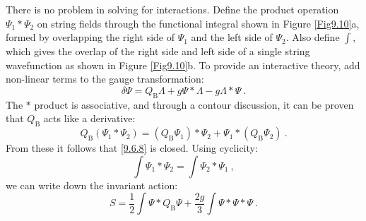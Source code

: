 There is no problem in solving for interactions. Define the product operation $\Psi_{1} * \Psi_{2}$ on string fields through the functional integral shown in Figure \ref{Fig9.10}a, 
formed by overlapping the right side of $\Psi_{1}$ and the left side of $\Psi_{2}$.
Also define $\int$, which gives the overlap of the right side and left side of a single string wavefunction as shown in Figure \ref{Fig9.10}b. 
To provide an interactive theory, add non-linear terms to the gauge transformation:
\begin{equation}
	\delta \Psi=Q_{\mathrm{B}} \Lambda+g \Psi * \Lambda-g \Lambda * \Psi \:.
	\label{9.6.8}
\end{equation}
The $*$ product is associative, and through a contour discussion, it can be proven that $Q_{\mathrm{B}}$ acts like a derivative:
\begin{equation}
	Q_{\mathrm{B}}(\Psi_{1} * \Psi_{2})=(Q_{\mathrm{B}} \Psi_{1}) * \Psi_{2}+\Psi_{1} *(Q_{\mathrm{B}} \Psi_{2}) \:. \label{9.6.9}
\end{equation}
From these it follows that \eqref{9.6.8} is closed.
Using cyclicity:
\begin{equation}
	\int \Psi_{1} * \Psi_{2}=\int \Psi_{2} * \Psi_{1} \:, \label{9.6.10}
\end{equation}
we can write down the invariant action:
\begin{equation}
	S=\frac{1}{2} \int \Psi * Q_{\mathrm{B}} \Psi + \frac{2 g}{3} \int \Psi * \Psi * \Psi \:.
	\label{9.6.11}
\end{equation}
